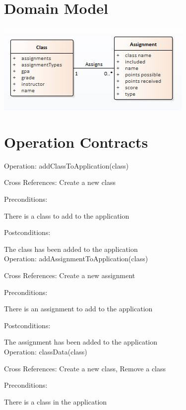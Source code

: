 \documentclass[12pt]{article}
\begin{document}
\newpage

\section*{Domain Model}

\includegraphics[width=\textwidth]{DomainModel}

\newpage

\section*{Operation Contracts}

\noindent
Operation: addClassToApplication(class)

\noindent
Cross References: Create a new class

\noindent
Preconditions:

There is a class to add to the application

\noindent
Postconditions:

The class has been added to the application \\

\noindent
Operation: addAssignmentToApplication(class)

\noindent
Cross References: Create a new assignment

\noindent
Preconditions:

There is an assignment to add to the application

\noindent
Postconditions:

The assignment has been added to the application \\ 

\noindent
Operation: classData(class)

\noindent
Cross References: Create a new class, Remove a class

\noindent
Preconditions:

There is a class in the application
\end{document}
